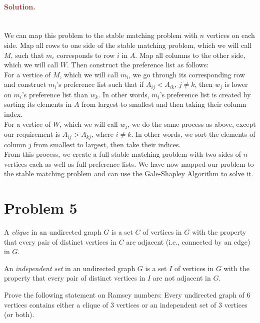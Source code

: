 \paragraph{\textcolor{brown}{Solution.}} \: \\
We can map this problem to the stable matching problem with $n$ vertices on each side. Map all rows to one side of the stable matching problem, which we will call $M$, such that $m_i$ corresponds to row $i$ in $A$. Map all columns to the other side, which we will call $W$. Then construct the preference list as follows:
\\For a vertice of $M$, which we will call $m_i$, we go through its corresponding row and construct $m_i$'s preference list such that if $A_{ij} < A_{ik}$, $j \neq k$, then $w_j$ is lower on $m_i$'s preference list than $w_k$. In other words, $m_i$'s preference list is created by sorting its elements in $A$ from largest to smallest and then taking their column index.
\\For a vertice of $W$, which we will call $w_j$, we do the same process as above, except our requirement is $A_{ij} > A_{kj}$, where $i \neq k$. In other words, we sort the elements of column $j$ from smallest to largest, then take their indices.
\\From this process, we create a full stable matching problem with two sides of $n$ vertices each as well as full preference lists. We have now mapped our problem to the stable matching problem and can use the Gale-Shapley Algorithm to solve it.

\section*{Problem 5}
A \emph{clique} in an undirected graph $G$ is a set $C$ of vertices in $G$ with the property that every pair of distinct vertices in $C$ are adjacent (i.e., connected by an edge) in $G$.

An \emph{independent set} in an undirected graph $G$ is a set $I$ of vertices in $G$ with the property that every pair of distinct vertices in $I$ are not adjacent in $G$.

Prove the following statement on Ramsey numbers: Every undirected graph of $6$ vertices contains either a clique of $3$ vertices or an independent set of $3$ vertices (or both).

